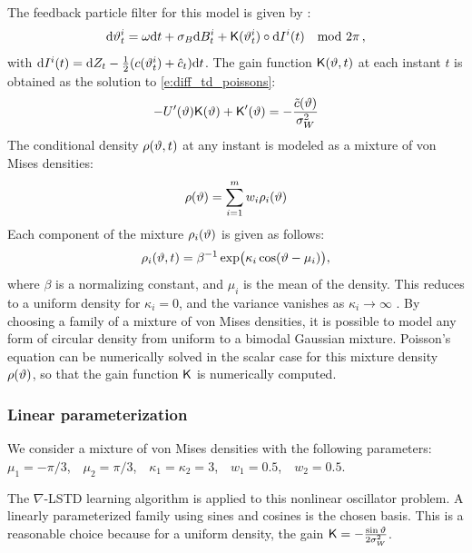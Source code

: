 The feedback particle filter for this model is given by :
\begin{equation*}
\text{d} \vartheta^{i}_t = \omega \text{d} t +\sigma_{B}\text{d} B^{i}_t+\text{\sf K}(\vartheta^{i}_t) \circ \text{d} I^i(t)  \quad  \text{mod }2\pi\, ,
\end{equation*}
with $\text{d} I^i(t) = \text{d} Z_t-\frac{1}{2}(c(\vartheta_t^{i})+{\hat c}_t)\text{d} t$.
The gain function $\text{\sf K}(\vartheta,t)$ at each instant $t$ is obtained as the solution to \eqref{e:diff_td_poissons}:
\begin{equation*}
- U'(\oscState) \kFPF(\oscState) + \kFPF'(\oscState) = -\frac{\tilc(\oscState)}{\sigma^2_W}  %
\end{equation*}
The conditional density $\rho(\vartheta,t)$ at any instant is modeled as a mixture of von Mises densities:
\begin{equation*}
\rho(\vartheta)=\sum_{i=1}^{m}w_{i}\rho_i(\vartheta)
\end{equation*}
Each component of the mixture $\rho_i(\vartheta)$ is given as follows:
\begin{equation*}
\rho_i(\vartheta,t) =  \beta^{-1} \exp  \bigl( \kappa_i \cos(\vartheta-\mu_{i} )    \bigr),
\end{equation*}
where $\beta$ is a normalizing constant, and $\mu_{i}$ is the mean of the density. This reduces to   a uniform density for $\kappa_{i}=0$, and the variance vanishes as $\kappa_{i}\to \infty$ \cite{haspea00}. By choosing a family of a mixture of von Mises densities, it is possible to model any form of circular density from uniform to a bimodal Gaussian mixture.
Poisson's equation can be numerically solved in the scalar case for this mixture density $\rho(\vartheta)$, so that the gain function $\text{\sf K}$ is numerically computed.

\subsubsection*{Linear parameterization}
We consider a mixture of von Mises densities with the following parameters: $\mu_1 = -\pi/3$,\ \
$\mu_2 = \pi/3$,\ \
$\kappa_1=\kappa_2=3$,\ \
$w_1 =0.5$,\ \
$w_2 =0.5$.


The $\nabla$-LSTD learning algorithm is applied to this nonlinear oscillator problem. A linearly parameterized family using sines and cosines is the chosen basis. This is a reasonable choice because for a uniform density, the gain $\text{\sf K}=-\frac{\sin \vartheta}{2\sigma_{W}^{2}}$.

